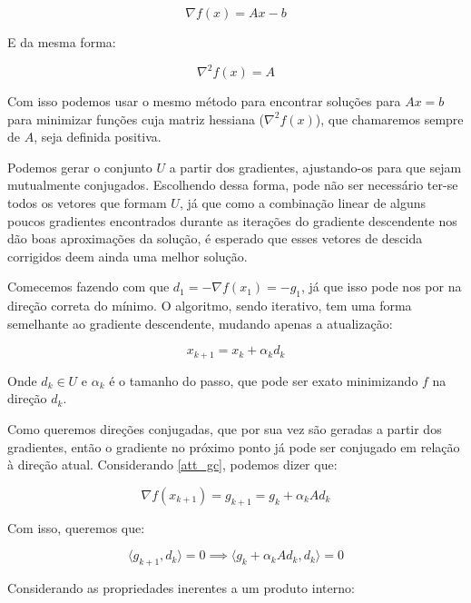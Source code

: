 \begin{equation}
\nabla f(x) = Ax - b
\end{equation}

E da mesma forma:

\begin{equation*}
\nabla^2 f(x) = A
\end{equation*}

Com isso podemos usar o mesmo método para encontrar soluções para \(Ax = b\) para
minimizar funções cuja matriz hessiana (\(\nabla^2 f(x)\)), que chamaremos sempre de \(A\),
seja definida positiva.

Podemos gerar o conjunto \(U\) a partir dos gradientes, ajustando-os para que sejam
mutualmente conjugados. Escolhendo dessa forma, pode não ser necessário ter-se todos os
vetores que formam \(U\), já que como a combinação linear de alguns poucos gradientes
encontrados durante as iterações do gradiente descendente nos dão boas aproximações da
solução, é esperado que esses vetores de descida corrigidos deem ainda uma melhor
solução.

Comecemos fazendo com que \(d_1 = -\nabla f(x_1) = -g_1 \), já que isso pode nos por na
direção correta do mínimo. O algoritmo, sendo iterativo, tem uma forma semelhante ao
gradiente descendente, mudando apenas a atualização:

\begin{equation}
\label{att_gc}
x_{k+1} = x_k + \alpha_k d_k
\end{equation}

Onde \(d_k \in U\) e \(\alpha_k\) é o tamanho do passo, que pode ser exato minimizando
\(f\) na direção \(d_k\).

Como queremos direções conjugadas, que por sua vez são geradas a partir dos gradientes,
então o gradiente no próximo ponto já pode ser conjugado em relação à direção atual.
Considerando \ref{att_gc}, podemos dizer que:

\begin{equation}
  \label{def_gc_gk1}
  \nabla f(x_{k+1}) = g_{k+1} = g_k + \alpha_k Ad_k
\end{equation}

Com isso, queremos que:

\begin{equation}
\label{def_gc_dk_gk1}
\langle g_{k+1}, d_k \rangle = 0 \implies \langle g_k + \alpha_k A d_k, d_k \rangle = 0
\end{equation}


Considerando as propriedades inerentes a um produto interno:

